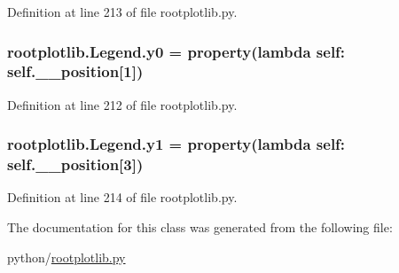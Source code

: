 Definition at line 213 of file rootplotlib.\-py.

\subsubsection[{y0}]{\setlength{\rightskip}{0pt plus 5cm}rootplotlib.\-Legend.\-y0 = property(lambda self\-: self.\-\_\-\-\_\-position\mbox{[}1\mbox{]})\hspace{0.3cm}{\ttfamily [static]}}\label{classrootplotlib_1_1Legend_a0028d0313be79ee86350021a3a7ba356}


Definition at line 212 of file rootplotlib.\-py.

\subsubsection[{y1}]{\setlength{\rightskip}{0pt plus 5cm}rootplotlib.\-Legend.\-y1 = property(lambda self\-: self.\-\_\-\-\_\-position\mbox{[}3\mbox{]})\hspace{0.3cm}{\ttfamily [static]}}\label{classrootplotlib_1_1Legend_a126548e38889a0678e7848542dfff154}


Definition at line 214 of file rootplotlib.\-py.



The documentation for this class was generated from the following file\-:\begin{DoxyCompactItemize}
\item 
python/\hyperlink{rootplotlib_8py}{rootplotlib.\-py}\end{DoxyCompactItemize}

